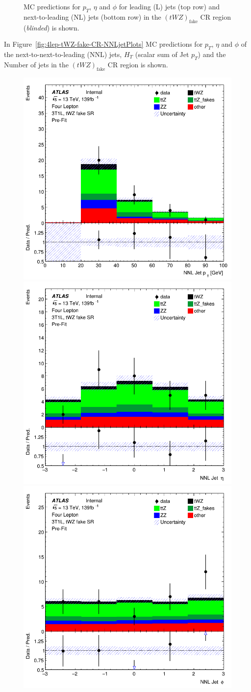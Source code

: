 \begin{figure}[htbp]
\begin{tabular}{ccc}
  \end{tabular}
    \caption{MC predictions for $p_{T}$, $\eta$ and $\phi$ for leading (L) jets (top row) and next-to-leading (NL) jets (bottom row) in the $(tWZ)_{\text{fake}}$ CR region (\textit{blinded}) is shown.}
    \label{fig:4lep-tWZ-fake-CR-LandNjetPlots} 
\end{figure}

In Figure~\ref{fig:4lep-tWZ-fake-CR-NNLjetPlots} MC predictions for $p_{T}$, $\eta$ and $\phi$ of the next-to-next-to-leading (NNL) jets, $H_{T}$ (scalar sum of Jet $p_{T}$) and the Number of jets in the $(tWZ)_{\text{fake}}$ CR region is shown.


\begin{figure}[htbp]
 \centering


    \includegraphics[width=.3\textwidth]{figures/PreFitPlots/lep4_tWZ_3T1L_NNLJet_pt.png} \quad
    \includegraphics[width=.3\textwidth]{figures/PreFitPlots/lep4_tWZ_3T1L_NNLJet_eta.png} \quad
    \includegraphics[width=.3\textwidth]{figures/PreFitPlots/lep4_tWZ_3T1L_NNLJet_phi.png}

    \medskip


\end{figure}
